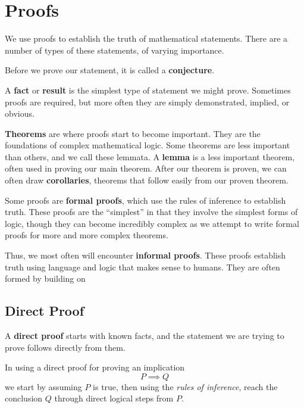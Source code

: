 \chapter{Proofs}
We use proofs to establish the truth of mathematical statements.
There are a number of types of these statements, of varying importance.

Before we prove our statement, it is called a \textbf{conjecture}.

A \textbf{fact} or \textbf{result} is the simplest type of statement we might prove.
Sometimes proofs are required, but more often they are simply demonstrated, implied, or obvious.

\textbf{Theorems} are where proofs start to become important.
They are the foundations of complex mathematical logic.
 Some theorems are less important than others, and we call these lemmata.
 A \textbf{lemma} is a less important theorem, often used in proving our main theorem.
 After our theorem is proven, we can often draw \textbf{corollaries}, theorems that follow easily from our proven theorem.

Some proofs are \textbf{formal proofs}, which use the rules of inference to establish truth.
These proofs are the ``simplest'' in that they involve the simplest forms of logic, though they can become incredibly complex as we attempt to write formal proofs for more and more complex theorems.

Thus, we most often will encounter \textbf{informal proofs}.
These proofs establish truth using language and logic that makes sense to humans.
They are often formed by building on

\section{Direct Proof}

A \textbf{direct proof} starts with known facts, and the statement we are trying to prove
follows directly from them.

In using a direct proof for proving an implication \[P \implies Q\]
we start by assuming $P$ is true, then using the \emph{rules of inference}, reach the conclusion
$Q$ through direct logical steps from $P$.

